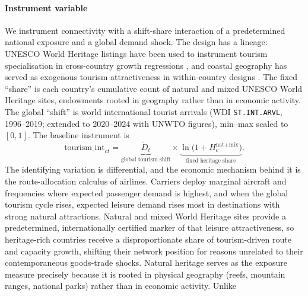 \paragraph{\textbf{Instrument variable}} We instrument connectivity with a shift-share
interaction of a predetermined national exposure and a global demand shock.
The design has a lineage: UNESCO World Heritage listings have been used to
instrument tourism specialisation in cross-country growth regressions
\citep{Arezki_2009}, and coastal geography has served as exogenous tourism
attractiveness in within-country designs \citep{Faber_2019}. The fixed
``share'' is each country's cumulative count of natural and mixed
UNESCO World Heritage sites, endowments rooted in geography rather than in
economic activity. The global ``shift'' is world international tourist
arrivals (WDI \texttt{ST.INT.ARVL}, 1996--2019; extended to 2020--2024 with UNWTO figures), min--max scaled to $[0,1]$. The baseline instrument is
\begin{equation}
\text{tourism\_int}_{ct}
= \underbrace{\widetilde{D}_t}_{\text{global tourism shift}}
\times \underbrace{\ln\!\bigl(1+H_c^{\text{nat+mix}}\bigr)}_{\text{fixed heritage share}}.
\label{eq:instr}
\end{equation}
The identifying variation is differential, and the economic mechanism behind it is the route-allocation calculus of airlines. Carriers deploy marginal aircraft and frequencies where expected passenger demand is
highest, and when the global tourism cycle rises, expected leisure demand rises most in destinations with strong natural attractions. Natural and mixed World Heritage sites provide a predetermined, internationally
certified marker of that leisure attractiveness, so heritage-rich countries receive a disproportionate share of tourism-driven route and capacity growth, shifting their network position for reasons unrelated to their
contemporaneous goods-trade shocks. Natural heritage serves as the exposure measure precisely because it is rooted in physical geography (reefs, mountain ranges, national parks) rather than in economic activity. Unlike
